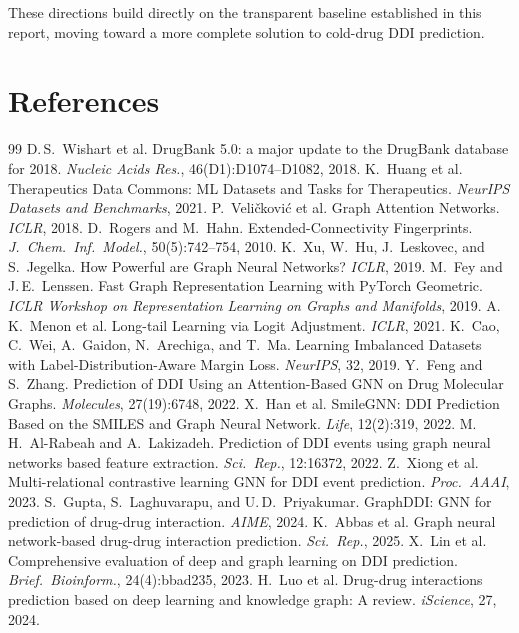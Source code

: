 \documentclass[11pt,a4paper]{report}
\begin{document}
These directions build directly on the transparent baseline established in this report, moving toward a more complete solution to cold-drug DDI prediction.

\chapter*{References}
\begin{thebibliography}{99}
D.\,S.\ Wishart et al.
DrugBank 5.0: a major update to the DrugBank database for 2018.
\emph{Nucleic Acids Res.}, 46(D1):D1074--D1082, 2018.
K.\ Huang et al.
Therapeutics Data Commons: ML Datasets and Tasks for Therapeutics.
\emph{NeurIPS Datasets and Benchmarks}, 2021.
P.\ Veli\v{c}kovi\'{c} et al.
Graph Attention Networks.
\emph{ICLR}, 2018.
D.\ Rogers and M.\ Hahn.
Extended-Connectivity Fingerprints.
\emph{J.\ Chem.\ Inf.\ Model.}, 50(5):742--754, 2010.
K.\ Xu, W.\ Hu, J.\ Leskovec, and S.\ Jegelka.
How Powerful are Graph Neural Networks?
\emph{ICLR}, 2019.
M.\ Fey and J.\,E.\ Lenssen.
Fast Graph Representation Learning with PyTorch Geometric.
\emph{ICLR Workshop on Representation Learning on Graphs and Manifolds}, 2019.
A.\,K.\ Menon et al.
Long-tail Learning via Logit Adjustment.
\emph{ICLR}, 2021.
K.\ Cao, C.\ Wei, A.\ Gaidon, N.\ Arechiga, and T.\ Ma.
Learning Imbalanced Datasets with Label-Distribution-Aware Margin Loss.
\emph{NeurIPS}, 32, 2019.
Y.\ Feng and S.\ Zhang.
Prediction of DDI Using an Attention-Based GNN on Drug Molecular Graphs.
\emph{Molecules}, 27(19):6748, 2022.
X.\ Han et al.
SmileGNN: DDI Prediction Based on the SMILES and Graph Neural Network.
\emph{Life}, 12(2):319, 2022.
M.\,H.\ Al-Rabeah and A.\ Lakizadeh.
Prediction of DDI events using graph neural networks based feature extraction.
\emph{Sci.\ Rep.}, 12:16372, 2022.
Z.\ Xiong et al.
Multi-relational contrastive learning GNN for DDI event prediction.
\emph{Proc.\ AAAI}, 2023.
S.\ Gupta, S.\ Laghuvarapu, and U.\,D.\ Priyakumar.
GraphDDI: GNN for prediction of drug-drug interaction.
\emph{AIME}, 2024.
K.\ Abbas et al.
Graph neural network-based drug-drug interaction prediction.
\emph{Sci.\ Rep.}, 2025.
X.\ Lin et al.
Comprehensive evaluation of deep and graph learning on DDI prediction.
\emph{Brief.\ Bioinform.}, 24(4):bbad235, 2023.
H.\ Luo et al.
Drug-drug interactions prediction based on deep learning and knowledge graph: A review.
\emph{iScience}, 27, 2024.
\end{thebibliography}
\end{document}
